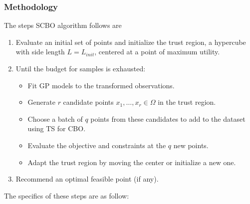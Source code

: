 \subsubsection{Methodology}
The steps SCBO algorithm follows are
\begin{enumerate}
    \item Evaluate an initial set of points and initialize the trust region, a hypercube with side length $L = L_{init}$, centered at a point of maximum utility.
    \item Until the budget for samples is exhausted:
    \begin{itemize}
        \item Fit GP models to the transformed observations. 
        \item Generate $r$ candidate points $x_1,\ldots,x_r\in \Omega$ in the trust region.
        \item Choose a batch of $q$ points from these candidates to add to the dataset using TS for CBO.
        \item Evaluate the objective and constraints at the $q$ new points.
        \item Adapt the trust region by moving the center or initialize a new one.
    \end{itemize}
    \item Recommend an optimal feasible point (if any).
\end{enumerate}
The specifics of these steps are as follow:
